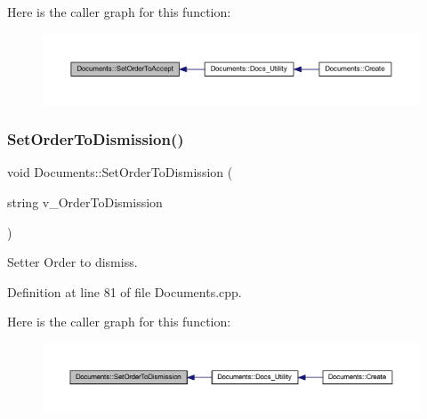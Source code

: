 Here is the caller graph for this function\+:
\nopagebreak
\begin{figure}[H]
\begin{center}
\leavevmode
\includegraphics[width=350pt]{class_documents_aa101f46efd37c76443f90822407bcaa3_icgraph}
\end{center}
\end{figure}
\mbox{\label{class_documents_ae91e6dba2623a69fafd9b886093087d0}} 
\subsubsection{\texorpdfstring{Set\+Order\+To\+Dismission()}{SetOrderToDismission()}}
{\footnotesize\ttfamily void Documents\+::\+Set\+Order\+To\+Dismission (\begin{DoxyParamCaption}\item[{string}]{v\+\_\+\+Order\+To\+Dismission }\end{DoxyParamCaption})}



Setter Order to dismiss. 



Definition at line 81 of file Documents.\+cpp.

Here is the caller graph for this function\+:
\nopagebreak
\begin{figure}[H]
\begin{center}
\leavevmode
\includegraphics[width=350pt]{class_documents_ae91e6dba2623a69fafd9b886093087d0_icgraph}
\end{center}
\end{figure}
\mbox{\label{class_documents_a484f3e195b0ab7383ef09278cd95907f}} 
